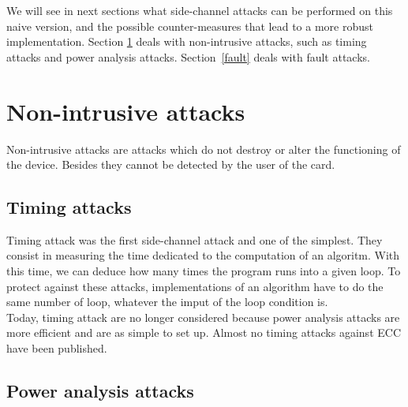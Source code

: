 \documentclass[journal]{IEEEtran}
\begin{document}
%    
%
%
%
%    
%
%    


We will see in next sections what side-channel attacks can be performed on this naive version, 
and the possible counter-measures that lead to a more robust implementation. Section \ref{non-intrusive}
deals with non-intrusive attacks, such as timing attacks and power analysis attacks. Section~\ref{fault}
deals with fault attacks.



\section{Non-intrusive attacks}
\label{non-intrusive}  

Non-intrusive attacks are attacks which do not destroy or alter the functioning of the device. Besides they cannot be detected by the user of the card. 
   
    \subsection{Timing attacks}

Timing attack was the first side-channel attack and one of the simplest. They consist in measuring the time dedicated to the computation of an algoritm. With this time, we can deduce how many times the program runs into a given loop.
To protect against these attacks, implementations of an algorithm have to do the same number of loop, whatever the imput of the loop condition is. \\

Today, timing attack are no longer considered because power analysis attacks are more efficient and are as simple to set up. Almost no timing attacks against ECC have been published.

    \subsection{Power analysis attacks}
\end{document}
